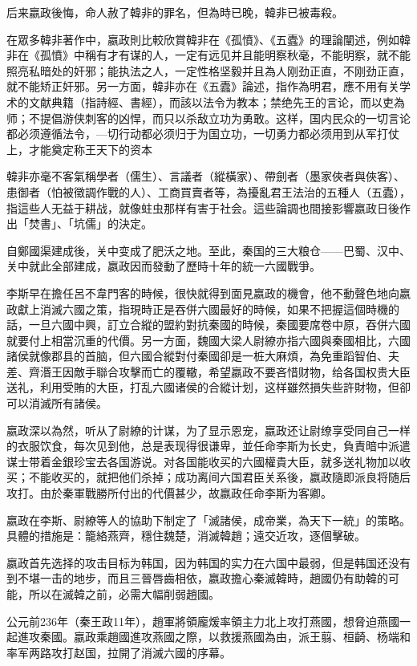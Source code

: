 后来嬴政後悔，命人赦了韓非的罪名，但為時已晚，韓非已被毒殺。

在眾多韓非著作中，嬴政則比較欣賞韓非在《孤憤》、《五蠹》的理論闡述，例如韓非在《孤憤》中稱有才有谋的人，一定有远见并且能明察秋毫，不能明察，就不能照亮私暗处的奸邪；能执法之人，一定性格坚毅并且為人刚劲正直，不刚劲正直，就不能矫正奸邪。另一方面，韓非亦在《五蠹》論述，指作為明君，應不用有关学术的文献典籍（指詩經、書經），而該以法令为教本；禁绝先王的言论，而以吏為师；不提倡游侠刺客的凶悍，而只以杀敌立功为勇敢。这样，国内民众的一切言论都必须遵循法令，—切行动都必须归于为国立功，一切勇力都必须用到从军打仗上，才能奠定称王天下的资本

韓非亦毫不客氣稱學者（儒生）、言議者（縱橫家）、帶劍者（墨家俠者與俠客）、患御者（怕被徵調作戰的人）、工商買賣者等，為擾亂君王法治的五種人（五蠹），指這些人无益于耕战，就像蛀虫那样有害于社会。這些論調也間接影響嬴政日後作出「焚書」、「坑儒」的決定。

自鄭國渠建成後，关中变成了肥沃之地。至此，秦国的三大粮仓——巴蜀、汉中、关中就此全部建成，嬴政因而發動了歷時十年的統一六國戰爭。

李斯早在擔任呂不韋門客的時候，很快就得到面見嬴政的機會，他不動聲色地向嬴政獻上消滅六國之策，指現時正是吞併六國最好的時候，如果不把握這個時機的話，一旦六國中興，訂立合縱的盟約對抗秦國的時候，秦國要席卷中原，吞併六國就要付上相當沉重的代價。另一方面，魏國大梁人尉繚亦指六國與秦國相比，六國諸侯就像郡县的首脑，但六國合縱對付秦國卻是一桩大麻煩，為免重蹈智伯、夫差、齊湣王因敵手聯合攻擊而亡的覆轍，希望嬴政不要吝惜财物，给各国权贵大臣送礼，利用受賄的大臣，打乱六國诸侯的合縱计划，这样雖然損失些許財物，但卻可以消滅所有諸侯。

嬴政深以為然，听从了尉繚的计谋，为了显示恩宠，嬴政还让尉缭享受同自己一样的衣服饮食，每次见到他，总是表现得很谦卑，並任命李斯为长史，負責暗中派遣谋士带着金銀珍宝去各国游说。对各国能收买的六國權貴大臣，就多送礼物加以收买；不能收买的，就把他们杀掉；成功离间六国君臣关系後，嬴政隨即派良将随后攻打。由於秦軍戰勝所付出的代價甚少，故嬴政任命李斯为客卿。

嬴政在李斯、尉繚等人的協助下制定了「滅諸侯，成帝業，為天下一統」的策略。具體的措施是：籠絡燕齊，穩住魏楚，消滅韓趙；遠交近攻，逐個擊破。

嬴政首先选择的攻击目标为韩国，因为韩国的实力在六国中最弱，但是韩国还没有到不堪一击的地步，而且三晉唇齒相依，嬴政擔心秦滅韓時，趙國仍有助韓的可能，所以在滅韓之前，必需大幅削弱趙國。

公元前236年（秦王政11年），趙軍將領龐煖率領主力北上攻打燕國，想脅迫燕國一起進攻秦國。嬴政乘趙國進攻燕國之際，以救援燕國為由，派王翦、桓齮、杨端和率军两路攻打赵国，拉開了消滅六國的序幕。

